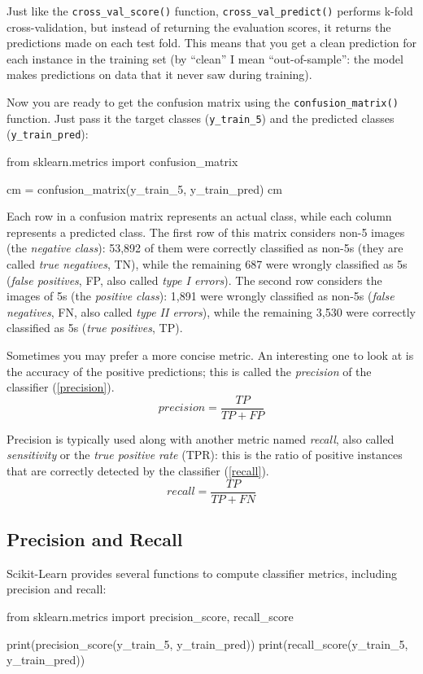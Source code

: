 Just like the \verb|cross_val_score()| function, \verb|cross_val_predict()| performs k-fold cross-validation, but instead of returning the evaluation scores, it returns the predictions made on each test fold. This means that you get a clean prediction for each instance in the training set (by ``clean” I mean ``out-of-sample”: the model makes predictions on data that it never saw during training).

Now you are ready to get the confusion matrix using the \verb|confusion_matrix()| function. Just pass it the target classes (\verb|y_train_5|) and the predicted classes
(\verb|y_train_pred|):
\begin{pyc}
from sklearn.metrics import confusion_matrix

cm = confusion_matrix(y_train_5, y_train_pred)
cm
\end{pyc}
Each row in a confusion matrix represents an actual class, while each column represents a predicted class. The first row of this matrix considers non-5 images (the \emph{negative class}): 53,892 of them were correctly classified as non-5s (they are called \emph{true negatives}, TN), while the remaining 687 were wrongly classified as 5s (\emph{false positives}, FP, also called \emph{type I errors}). The second row considers the images of 5s (the \emph{positive class}): 1,891 were wrongly classified as non-5s (\emph{false negatives}, FN, also called \emph{type II errors}), while the remaining 3,530 were correctly classified as 5s (\emph{true positives}, TP). 

Sometimes you may prefer a more concise metric. An interesting one to look at is the accuracy of the positive predictions; this is called the \emph{precision} of the classifier (\autoref{precision}).
\begin{equation}\label{precision}
    precision = \frac{TP}{TP+FP}
\end{equation}

Precision is typically used along with another metric named \emph{recall}, also called \emph{sensitivity} or the \emph{true positive rate} (TPR): this is the ratio of positive instances that are correctly detected by the classifier (\autoref{recall}).
\begin{equation}\label{recall}
    recall = \frac{TP}{TP+FN}
\end{equation}
\subsection{Precision and Recall}
Scikit-Learn provides several functions to compute classifier metrics, including precision and recall:
\begin{pyc}
from sklearn.metrics import precision_score, recall_score

print(precision_score(y_train_5, y_train_pred))
print(recall_score(y_train_5, y_train_pred))
\end{pyc}

